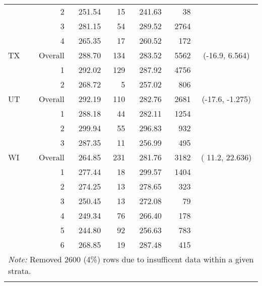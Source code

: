 \begin{longtable}{lrrr@{\extracolsep{.25cm}}rrc}
   & 2 & 251.54 &  15 & 241.63 &  38 &  \\ 
   & 3 & 281.15 &  54 & 289.52 & 2764 &  \\ 
   & 4 & 265.35 &  17 & 260.52 & 172 &  \\ 
   \hline
TX & Overall & 288.70 & 134 & 283.52 & 5562 & (-16.9,  6.564) \\ 
   & 1 & 292.02 & 129 & 287.92 & 4756 &  \\ 
   & 2 & 268.72 &   5 & 257.02 & 806 &  \\ 
   \hline
UT & Overall & 292.19 & 110 & 282.76 & 2681 & (-17.6, -1.275) \\ 
   & 1 & 288.18 &  44 & 282.11 & 1254 &  \\ 
   & 2 & 299.94 &  55 & 296.83 & 932 &  \\ 
   & 3 & 287.35 &  11 & 256.99 & 495 &  \\ 
   \hline
WI & Overall & 264.85 & 231 & 281.76 & 3182 & ( 11.2, 22.636) \\ 
   & 1 & 277.44 &  18 & 299.57 & 1404 &  \\ 
   & 2 & 274.25 &  13 & 278.65 & 323 &  \\ 
   & 3 & 250.45 &  13 & 272.08 &  79 &  \\ 
   & 4 & 249.34 &  76 & 266.40 & 178 &  \\ 
   & 5 & 244.80 &  92 & 256.63 & 783 &  \\ 
   & 6 & 268.85 &  19 & 287.48 & 415 &  \\ 
   \hline \multicolumn{7}{l}{\textit{Note:} Removed 2600 (4\%) rows due to insufficent data within a given strata.} \\\hline
\label{g8math-mlpsa-ctree}
\end{longtable}
